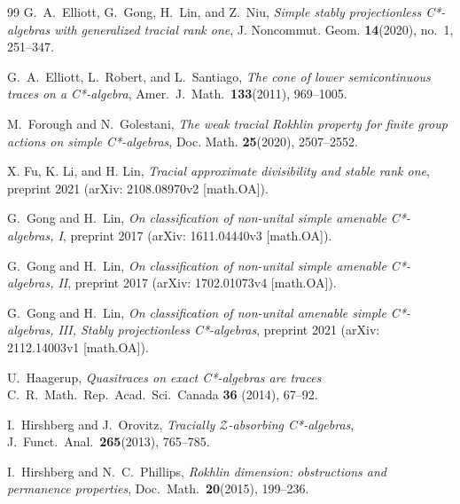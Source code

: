\documentclass[11pt]{amsart}
\theoremstyle{plain}
\theoremstyle{definition}
\theoremstyle{remark}
\numberwithin{equation}{section}
\begin{document}
\begin{thebibliography}{99}
G.~A.\  Elliott, G.~Gong, H.~Lin, and Z.~Niu,
{\emph{Simple stably projectionless C*-algebras
  with generalized tracial rank one}},
 J. Noncommut. Geom. \textbf{14}(2020), no.~1,  251–347.

G.~A.\  Elliott, L.~Robert, and L.~Santiago,
{\emph{The cone of lower semicontinuous traces on a C*-algebra}},
Amer.\  J.\  Math.\  {\textbf{133}}(2011), 969--1005.

M.~Forough and N.~Golestani,
{\emph{The weak tracial Rokhlin property for finite group actions on simple C*-algebras}},
Doc. Math. {\bf 25}(2020), 2507--2552.

X. Fu, K. Li, and H. Lin, \emph{Tracial approximate divisibility and stable rank one},
preprint 2021 (arXiv: 2108.08970v2 [math.OA]).


G.~Gong and H.~Lin,
{\emph{On classification of non-unital simple amenable
  C*-algebras, I}},
preprint 2017 (arXiv: 1611.04440v3 [math.OA]).


G.~Gong and H.~Lin,
{\emph{On classification of non-unital simple amenable
  C*-algebras, II}},
preprint 2017 (arXiv: 1702.01073v4 [math.OA]).

G.~Gong and H.~Lin,
{\emph{On classification of non-unital amenable simple C*-algebras, III, 
Stably projectionless C*-algebras}},
preprint 2021 (arXiv: 2112.14003v1 [math.OA]).

 U.~Haagerup,
{\emph{Quasitraces on exact C*-algebras are traces}}
C.~R.\  Math.\  Rep.\  Acad.\  Sci.\  Canada
{\textbf{36}} (2014), 67--92.

I.~Hirshberg and J.~Orovitz,
{\emph{Tracially ${\mathcal{Z}}$-absorbing C*-algebras}},
J.~Funct.\  Anal.\  {\textbf{265}}(2013), 765--785.

 I.~Hirshberg and N.~C.\  Phillips,
{\emph{Rokhlin dimension: obstructions and permanence properties}},
Doc.\  Math.\  {\textbf{20}}(2015), 199--236.




\end{thebibliography}
\end{document}
